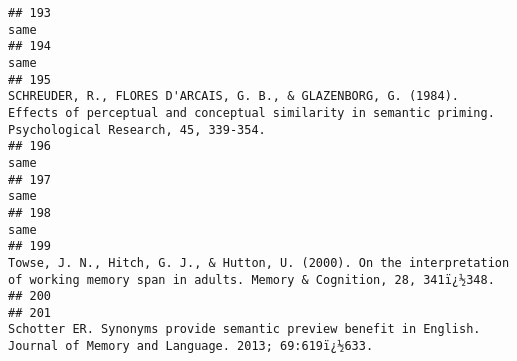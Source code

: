\documentclass[
  english,
  man]{apa6}
\begin{document}
\begin{verbatim}
## 193                                                                                                                                                                                                                                                                                                                same
## 194                                                                                                                                                                                                                                                                                                                same
## 195                                                                                                                                           SCHREUDER, R., FLORES D'ARCAIS, G. B., & GLAZENBORG, G. (1984). Effects of perceptual and conceptual similarity in semantic priming. Psychological Research, 45, 339-354.
## 196                                                                                                                                                                                                                                                                                                                same
## 197                                                                                                                                                                                                                                                                                                                same
## 198                                                                                                                                                                                                                                                                                                                same
## 199                                                                                                                                                                         Towse, J. N., Hitch, G. J., & Hutton, U. (2000). On the interpretation of working memory span in adults. Memory & Cognition, 28, 341ï¿½348.
## 200                                                                                                                                                                                                                                                                                                                    
## 201                                                                                                                                                                                              Schotter ER. Synonyms provide semantic preview benefit in English. Journal of Memory and Language. 2013; 69:619ï¿½633.

\end{verbatim}
\end{document}

